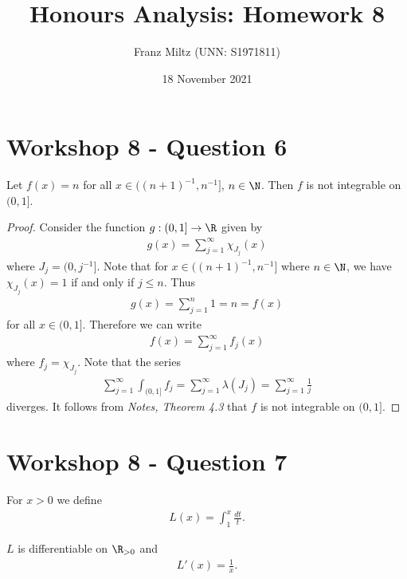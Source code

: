 \documentclass{article}
\begin{document}
\title{Honours Analysis: Homework 8}
\author{Franz Miltz (UNN: S1971811)}
\date{18 November 2021}
\maketitle

\section*{Workshop 8 - Question 6}

\begin{claim*}
   Let $f(x)=n$ for all $x\in((n+1)^{-1}, n^{-1}]$, $n\in\N$. Then $f$ is not integrable on 
   $(0,1]$.
\end{claim*}
\begin{proof}
   Consider the function $g:(0,1]\to\R$ given by 
   \begin{align*}
      g(x) = \sum_{j=1}^\infty \chi_{J_j}(x)
   \end{align*}
   where $J_j = (0, j^{-1}]$. Note that for $x\in((n+1)^{-1}, n^{-1}]$ where $n\in\N$,
   we have $\chi_{J_j}(x)=1$ if and only if $j\leq n$. Thus 
   \begin{align*}
      g(x) = \sum_{j=1}^n 1 = n = f(x)
   \end{align*}
   for all $x\in(0,1]$. Therefore we can write 
   \begin{align*}
      f(x) = \sum_{j=1}^\infty f_j(x)
   \end{align*}
   where $f_j=\chi_{J_j}$. Note that the series 
   \begin{align*}
      \sum_{j=1}^\infty \int_{(0,1]} f_j = \sum_{j=1}^\infty \lambda(J_j)  
      = \sum_{j=1}^\infty \frac{1}{j}
   \end{align*}
   diverges. It follows from \emph{Notes, Theorem 4.3} that $f$ is not integrable on $(0,1]$. 
\end{proof}

\section*{Workshop 8 - Question 7}

For $x>0$ we define 
\begin{align*}
   L(x) = \int_1^x \frac{dt}{t}.
\end{align*}

\begin{claim*}
   $L$ is differentiable on $\R_{>0}$ and
   \begin{align}
      \label{deriv}
      L'(x) = \frac{1}{x}.
   \end{align}
\end{claim*}
\end{document}
